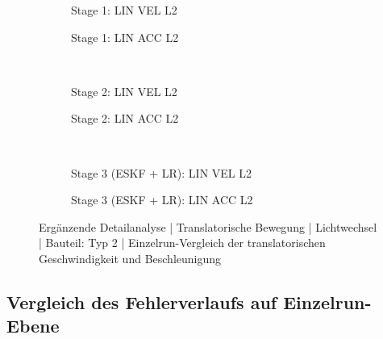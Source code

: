 \begin{figure}[htbp]
    \centering
    \begin{subfigure}[b]{0.49\textwidth}
        \caption{Stage 1: LIN VEL L2}
        \label{fig:c_1_4_Typ2_ibvs_lin_vel_l2}
    \end{subfigure}
    \hfill
    \begin{subfigure}[b]{0.49\textwidth}
        \caption{Stage 1: LIN ACC L2}
        \label{fig:c_1_4_Typ2_ibvs_lin_acc_l2}
    \end{subfigure}\

    \vfill

    \begin{subfigure}[b]{0.49\textwidth}
        \caption{Stage 2: LIN VEL L2}
        \label{fig:c_2_4_ESKF_Typ2_ibvs_lin_vel_l2}
    \end{subfigure}
    \hfill
    \begin{subfigure}[b]{0.49\textwidth}
        \caption{Stage 2: LIN ACC L2}
        \label{fig:c_2_4_ESKF_Typ2_ibvs_lin_acc_l2}
    \end{subfigure}\

    \vfill

    \begin{subfigure}[b]{0.49\textwidth}
        \caption{Stage 3 (ESKF + LR): LIN VEL L2}
        \label{fig:c_3_4_ESKF_Typ2_ibvs_lin_vel_l2}
    \end{subfigure}
    \hfill
    \begin{subfigure}[b]{0.49\textwidth}
        \caption{Stage 3 (ESKF + LR): LIN ACC L2}
        \label{fig:c_3_4_ESKF_Typ2_ibvs_lin_acc_l2}
    \end{subfigure}
    \caption{Ergänzende Detailanalyse | Translatorische Bewegung | Lichtwechsel | Bauteil: Typ 2 | Einzelrun-Vergleich der translatorischen Geschwindigkeit und Beschleunigung}
    \label{fig:c_4_typ2_vel_acc_runs}
\end{figure}

\subsection{Vergleich des Fehlerverlaufs auf Einzelrun-Ebene}

